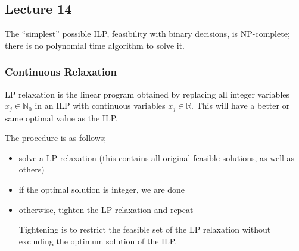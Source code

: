 \documentclass[a4paper, 12pt]{article}
\begin{document}
        \subsection*{Lecture 14}
            The ``simplest'' possible ILP, feasibility with binary decisions, is NP-complete; there is no polynomial time algorithm to solve it.
            \subsubsection*{Continuous Relaxation}
                LP relaxation is the linear program obtained by replacing all integer variables $x_j \in \mathbb{N}_0$ in an ILP with continuous variables $x_j \in \mathbb{R}$.
                This will have a better or same optimal value as the ILP.
                \medskip

                The procedure is as follows;
                \begin{itemize}
                    \itemsep0em
                    \item solve a LP relaxation (this contains all original feasible solutions, as well as others)
                    \item if the optimal solution is integer, we are done
                    \item otherwise, tighten the LP relaxation and repeat
                        \smallskip

                        Tightening is to restrict the feasible set of the LP relaxation without excluding the optimum solution of the ILP.
                \end{itemize}
\end{document}
